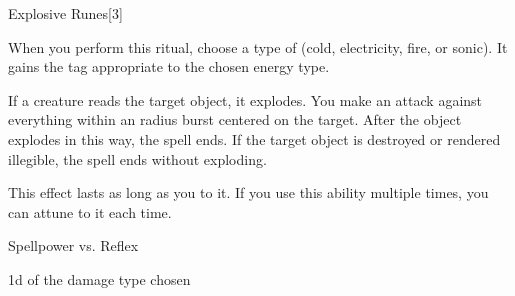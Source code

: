 \begin{spellsection}{Explosive Runes}[3]

\begin{spellcontent}

\begin{spelltargetinginfo}



\end{spelltargetinginfo}


\begin{spelleffects}
\spellspecial
When you perform this ritual, choose a type of  (cold, electricity, fire, or sonic).
It gains the tag appropriate to the chosen energy type.



\spelleffect
If a creature reads the target object, it explodes.
You make an attack against everything within an \areamed radius burst centered on the target.
After the object explodes in this way, the spell ends.
If the target object is destroyed or rendered illegible, the spell ends without exploding.

This effect lasts as long as you  to it.
If you use this ability multiple times, you can attune to it each time.




\begin{spellattack}{Spellpower vs. Reflex}


\hit {} \minus1d of the damage type chosen


\end{spellattack}





\end{spelleffects}

\end{spellcontent}
\begin{spellfooter}


\end{spellfooter}
\begin{spellsubcontent}


\end{spellsubcontent}
\end{spellsection}


